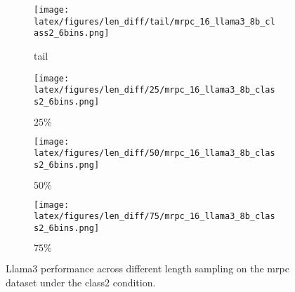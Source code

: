 \begin{figure*}
    \centering
    \begin{minipage}[t]{\linewidth}
        \begin{subfigure}{0.245\linewidth}
            \centering
            \texttt{[image: latex/figures/len\_diff/tail/mrpc\_16\_llama3\_8b\_class2\_6bins.png]}
            \caption{tail}\label{fig:image1}
        \end{subfigure}%
        \hfill
        \begin{subfigure}{0.245\linewidth}
            \centering
            \texttt{[image: latex/figures/len\_diff/25/mrpc\_16\_llama3\_8b\_class2\_6bins.png]}
            \caption{$25\%$}\label{fig:image2}
        \end{subfigure}
        \hfill
        \begin{subfigure}{0.245\linewidth}
            \centering
            \texttt{[image: latex/figures/len\_diff/50/mrpc\_16\_llama3\_8b\_class2\_6bins.png]}
            \caption{$50\%$}\label{fig:image3}
        \end{subfigure}
        \begin{subfigure}{0.245\linewidth}
            \centering
            \texttt{[image: latex/figures/len\_diff/75/mrpc\_16\_llama3\_8b\_class2\_6bins.png]}
            \caption{$75\%$}\label{fig:image4}
        \end{subfigure}%
    \end{minipage}%
    \hfill
    \begin{minipage}[c]{\linewidth}
        \caption{\label{fig:llama3-len-qnli}Llama3 performance across different length sampling on the mrpc dataset under the class2 condition.}
    \end{minipage}
\end{figure*}